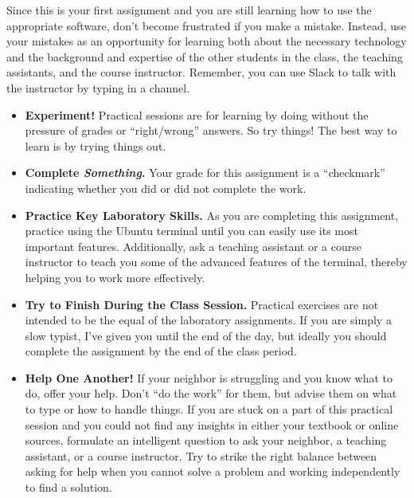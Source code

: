 \noindent Since this is your first  assignment and you are still learning how to use the appropriate software,
    don't become frustrated if you make a mistake. Instead, use your mistakes as an opportunity for learning both about
    the necessary technology and the background and expertise of the other students in the class, the teaching
    assistants, and the course instructor. Remember, you can use Slack to talk with the instructor by typing
     in a channel.
\begin{itemize}
\item {\bf Experiment!} Practical sessions are for learning by doing without the pressure of grades or ``right/wrong''
  answers. So try things!  The best way to learn is by trying things out.

\item {\bf Complete \textbf{\textit{Something}}.} Your grade for this assignment is a ``checkmark'' indicating whether you
  did or did not complete the work.

\item {\bf Practice Key Laboratory Skills.} As you are completing this assignment, practice using the Ubuntu terminal until you can easily use its most important features.  Additionally, ask
  a teaching assistant or a course instructor to teach you some of the advanced features of the terminal, thereby helping you to work more effectively. 

\item {\bf Try to Finish During the Class Session.} Practical exercises are not intended to be the equal of the
  laboratory assignments. If you are simply a slow typist, I've given you until the end of the day, but ideally you
  should complete the assignment by the end of the class period. 

\item {\bf Help One Another!} If your neighbor is struggling and you know what to do, offer your help. Don't ``do the
  work'' for them, but advise them on what to type or how to handle things. If you are stuck on a part of this practical
  session and you could not find any insights in either your textbook or online sources, formulate an intelligent
  question to ask your neighbor, a teaching assistant, or a course instructor. Try to strike the right balance between
  asking for help when you cannot solve a problem and working independently to find a solution.
\end{itemize}


